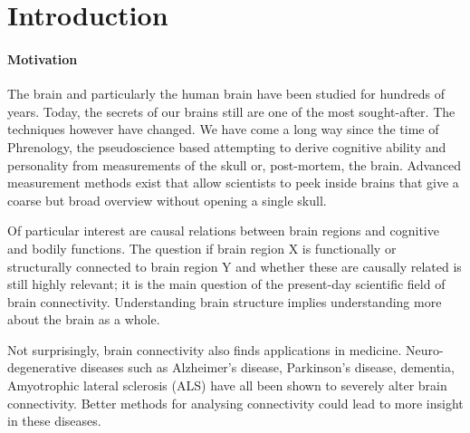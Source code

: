 \documentclass[a4paper, 10pt, english, twocolumn]{article}
\title{\fontfamily{phv}\selectfont{Causal Discovery methods for Effective Connectivity}}
\author{
  \textbf{R. Janssen} - \href{mailto:ramon.janssen@student.ru.nl}{ramon.janssen@student.ru.nl} \\
  \textbf{T. de Ruijter} - \href{mailto:t.deruijter@student.ru.nl}{t.deruijter@student.ru.nl}\\
  \textbf{T. Claassen} - \href{mailto:tomc@cs.ru.nl}{tomc@cs.ru.nl}\\
  \textbf{M. Hinne} - \href{mailto:mhinne@cs.ru.nl}{mhinne@cs.ru.nl}
}
\date{\fontfamily{ptm}\selectfont{\small{\bfseries{\today - Radboud
Universiteit Nijmegen}}}\\[0.5cm]\rule{\linewidth}{0.3mm}}
\newcommand{\keywords}[1]{\par\noindent 
{\bf Keywords\/}. #1}
\begin{document}
\maketitle

\begin{abstract}
Lorem Ipsum Dolor Sit Amet.
\keywords{Keywords}
\end{abstract}

\setlength{\parindent}{0.0cm}
\setlength{\parskip}{0.25cm}

\section{Introduction}


\paragraph{Motivation}
The brain and particularly the human brain have been studied for hundreds of years.
Today, the secrets of our brains still are one of the most sought-after.
The techniques however have changed.
We have come a long way since the time of Phrenology, the pseudoscience based attempting to derive cognitive ability and personality from measurements of the skull or, post-mortem, the brain.
Advanced measurement methods exist that allow scientists to peek inside brains that give a coarse but broad overview without opening a single skull.

Of particular interest are causal relations between brain regions and cognitive and bodily functions.
The question if brain region X is functionally or structurally connected to brain region Y and whether these are causally related is still highly relevant; it is the main question of the present-day scientific field of brain connectivity.
Understanding brain structure implies understanding more about the brain as a whole.

Not surprisingly, brain connectivity also finds applications in medicine.
Neuro-degenerative diseases such as Alzheimer's disease, Parkinson's disease, dementia, Amyotrophic lateral sclerosis (ALS) have all been shown to severely alter brain connectivity. %
Better methods for analysing connectivity could lead to more insight in these diseases.
\end{document}
